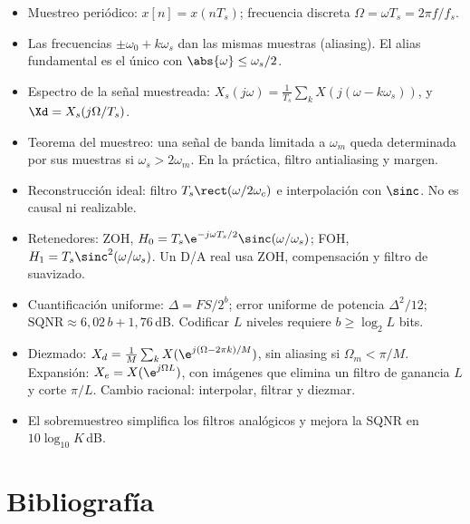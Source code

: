 \documentclass[11pt,a4paper]{scrartcl}
\begin{document}
\begin{itemize}
  \item Muestreo periódico: $x[n]=x(nT_s)$; frecuencia discreta $\Omega=\omega T_s=2\pi f/f_s$.
  \item Las frecuencias $\pm\omega_0+k\omega_s$ dan las mismas muestras (aliasing). El alias fundamental es el único con $\abs{\omega}\le\omega_s/2$.
  \item Espectro de la señal muestreada: $X_s(j\omega)=\frac1{T_s}\sum_kX(j(\omega-k\omega_s))$, y $\Xd=X_s(j\Omega/T_s)$.
  \item Teorema del muestreo: una señal de banda limitada a $\omega_m$ queda determinada por sus muestras si $\omega_s>2\omega_m$. En la práctica, filtro antialiasing y margen.
  \item Reconstrucción ideal: filtro $T_s\rect(\omega/2\omega_c)$ e interpolación con $\sinc$. No es causal ni realizable.
  \item Retenedores: ZOH, $H_0=T_s\e^{-j\omega T_s/2}\sinc(\omega/\omega_s)$; FOH, $H_1=T_s\sinc^2(\omega/\omega_s)$. Un D/A real usa ZOH, compensación y filtro de suavizado.
  \item Cuantificación uniforme: $\Delta=FS/2^b$; error uniforme de potencia $\Delta^2/12$; $\mathrm{SQNR}\approx6{,}02\,b+1{,}76$\,dB. Codificar $L$ niveles requiere $b\ge\log_2L$ bits.
  \item Diezmado: $X_d=\frac1M\sum_kX(\e^{j(\Omega-2\pi k)/M})$, sin aliasing si $\Omega_m<\pi/M$. Expansión: $X_e=X(\e^{j\Omega L})$, con imágenes que elimina un filtro de ganancia $L$ y corte $\pi/L$. Cambio racional: interpolar, filtrar y diezmar.
  \item El sobremuestreo simplifica los filtros analógicos y mejora la SQNR en $10\log_{10}K$\,dB.
\end{itemize}

\section*{Bibliografía}
\end{document}
